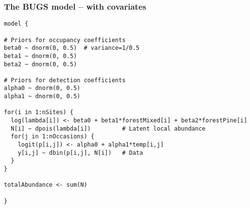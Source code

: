 \documentclass[color=usenames,dvipsnames]{beamer}\usepackage[]{graphicx}\usepackage[]{color}
\makeatletter
\newenvironment{kframe}{%
 \def\at@end@of@kframe{}%
 \ifinner\ifhmode%
  \def\at@end@of@kframe{\end{minipage}}%
  \begin{minipage}{\columnwidth}%
 \fi\fi%
 \def\FrameCommand##1{\hskip\@totalleftmargin \hskip-\fboxsep
 \colorbox{shadecolor}{##1}\hskip-\fboxsep
     \hskip-\linewidth \hskip-\@totalleftmargin \hskip\columnwidth}%
 \MakeFramed {\advance\hsize-\width
   \@totalleftmargin\z@ \linewidth\hsize
   \@setminipage}}%
 {\par\unskip\endMakeFramed%
 \at@end@of@kframe}
\newenvironment{knitrout}{}{} %
\makeatother
\begin{document}
\begin{frame}[fragile]
  \frametitle{The BUGS model -- with covariates}
\begin{knitrout}\scriptsize
{}\color{fgcolor}\begin{kframe}
\begin{verbatim}
model {

# Priors for occupancy coefficients
beta0 ~ dnorm(0, 0.5)  # variance=1/0.5
beta1 ~ dnorm(0, 0.5)
beta2 ~ dnorm(0, 0.5)

# Priors for detection coefficients
alpha0 ~ dnorm(0, 0.5)  
alpha1 ~ dnorm(0, 0.5)

for(i in 1:nSites) {
  log(lambda[i]) <- beta0 + beta1*forestMixed[i] + beta2*forestPine[i]
  N[i] ~ dpois(lambda[i])         # Latent local abundance
  for(j in 1:nOccasions) {
    logit(p[i,j]) <- alpha0 + alpha1*temp[i,j]
    y[i,j] ~ dbin(p[i,j], N[i])   # Data
  }
}

totalAbundance <- sum(N)

}
\end{verbatim}
\end{kframe}
\end{knitrout}

\end{frame}
\end{document}
